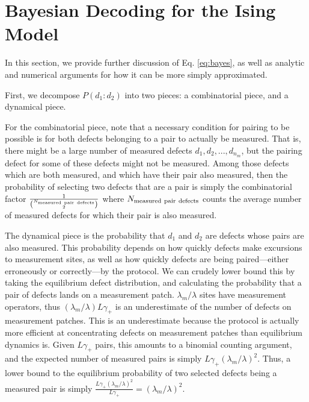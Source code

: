 \documentclass[twocolumn,superscriptaddress,aps,prb,floatfix]{revtex4-1}
\begin{document}


\appendix
\section{Bayesian Decoding for the Ising Model}
\label{sec:bayesdecoder}

In this section, we provide further discussion of Eq. \ref{eq:bayes}, as well as analytic and numerical arguments for how it can be more simply approximated.

First, we decompose $P(d_1 : d_2)$ into two pieces: a combinatorial piece, and a dynamical piece.

For the combinatorial piece, note that a necessary condition for pairing to be possible is for both defects belonging to a pair to actually be measured.  That is, there might be a large number of measured defects ${d_1, d_2, ..., d_{n_m}}$, but the pairing defect for some of these defects might not be measured. Among those defects which are both measured, and which have their pair also measured, then the probability of selecting two defects that are a pair is simply the combinatorial factor $\frac{1}{\binom{N_{\rm{measured\ pair\ defects}}}{2}}$ where $N_{\rm{measured\ pair\ defects}}$ counts the average number of measured defects for which their pair is also measured.

The dynamical piece is the probability that $d_1$ and $d_2$ are defects whose pairs are also measured.  This probability depends on how quickly defects make excursions to measurement sites, as well as how quickly defects are being paired---either erroneously or correctly---by the protocol.  We can crudely lower bound this by taking the equilibrium defect distribution, and calculating the probability that a pair of defects lands on a measurement patch.  $\lambda_m / \lambda$ sites have measurement operators, thus $(\lambda_m / \lambda) L \gamma_+$ is an underestimate of the number of defects on measurement patches.  This is an underestimate because the protocol is actually more efficient at concentrating defects on measurement patches than equilibrium dynamics is.  Given $L \gamma_+$ pairs, this amounts to a binomial counting argument, and the expected number of measured pairs is simply $L \gamma_+ (\lambda_m / \lambda)^2$.  Thus, a lower bound to the equilibrium probability of two selected defects being a measured pair is simply $\frac{L \gamma_+(\lambda_m / \lambda)^2}{L \gamma_+} = (\lambda_m / \lambda)^2$.
\end{document}
